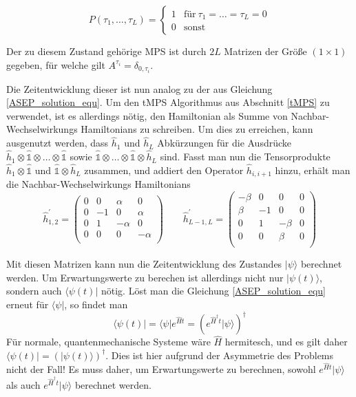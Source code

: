 \documentclass[10pt,a4paper]{report}
\begin{document}
\begin{equation}
P(\tau_1,\ldots,\tau_L)=
\begin{cases}
1 & \text{für}\ \tau_1=\ldots=\tau_L=0\\
0 & \text{sonst}
\end{cases}
\end{equation}

Der zu diesem Zustand gehörige MPS ist durch $2L$ Matrizen der Größe $(1\times 1)$ gegeben, für welche gilt $A^{\tau_i}=\delta_{0,\tau_i}$. \par

Die Zeitentwicklung dieser ist nun analog zu der aus Gleichung \ref{ASEP_solution_equ}. Um den tMPS Algorithmus aus Abschnitt \ref{tMPS} zu verwendet, ist es allerdings nötig, den Hamiltonian als Summe von Nachbar-Wechselwirkungs Hamiltonians zu schreiben. Um dies zu erreichen, kann ausgenutzt werden, dass $\hat{h}_1$ und $\hat{h}_L$ Abkürzungen für die Ausdrücke $\hat{h}_1\otimes\hat{\mathbb{1}}\otimes\ldots\otimes\hat{\mathbb{1}}$ sowie $\hat{\mathbb{1}}\otimes\ldots\otimes\hat{\mathbb{1}}\otimes\hat{h}_L$ sind. Fasst man nun die Tensorprodukte $\hat{h}_1\otimes\hat{\mathbb{1}}$ und $\hat{\mathbb{1}}\otimes\hat{h}_L$ zusammen, und addiert den Operator $\hat{h}_{i,i+1}$ hinzu, erhält man die Nachbar-Wechselwirkungs Hamiltonians
\begin{equation}
\hat{h}_{1,2}^\prime=
\begin{pmatrix}
0&0&\alpha&0\\
0&-1&0&\alpha\\
0&1&-\alpha&0\\
0&0&0&-\alpha\\
\end{pmatrix}
\qquad
\hat{h}_{L-1,L}^\prime=
\begin{pmatrix}
-\beta&0&0&0\\
\beta&-1&0&0\\
0&1&-\beta&0\\
0&0&\beta&0\\
\end{pmatrix}
\end{equation} 

Mit diesen Matrizen kann nun die Zeitentwicklung des Zustandes $|\psi\rangle$ berechnet werden. Um Erwartungswerte zu berechen ist allerdings nicht nur $|\psi(t)\rangle$, sondern auch $\langle\psi(t)|$ nötig. Löst man die Gleichung \ref{ASEP_solution_equ} erneut für $\langle\psi|$, so findet man
\begin{equation}
\langle\psi(t)|=\langle\psi|e^{\hat{H}t}=(e^{\hat{H}^\dagger t}|\psi\rangle)^\dagger
\end{equation}
Für normale, quantenmechanische Systeme wäre $\hat{H}$ hermitesch, und es gilt daher $\langle\psi(t)|=(|\psi(t)\rangle)^\dagger$. Dies ist hier aufgrund der Asymmetrie des Problems nicht der Fall! Es muss daher, um Erwartungswerte zu berechnen, sowohl $e^{\hat{H} t}|\psi\rangle$ als auch $e^{\hat{H}^\dagger t}|\psi\rangle$ berechnet werden.
\end{document}
